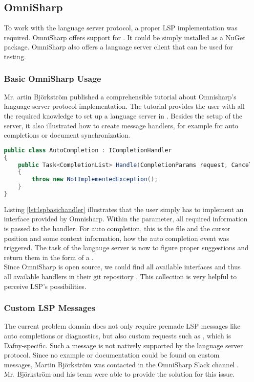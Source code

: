 \subsection{OmniSharp}
\label{section:analysis:omnisharp}
To work with the language server protocol, a proper LSP implementation was required.
OmniSharp offers support for \Csharp \cite{langserverdotorg}.
It could be simply installed as a NuGet package.
OmniSharp also offers a language server client that can be used for testing.

\subsubsection{Basic OmniSharp Usage}
Mr. artin Bj\"orkstr\"om published a comprehensible tutorial about Omnisharp's language server protocol implementation.
The tutorial provides the user with all the required knowledge to set up a language server in \Csharp.
Besides the setup of the server, it also illustrated how to create message handlers, for example for auto completions or document synchronization.

\begin{lstlisting}[language=csharp, caption={LSP Handler Implementation}, captionpos=b, label={lst:lspbasichandler}]
public class AutoCompletion : ICompletionHandler
{
    public Task<CompletionList> Handle(CompletionParams request, CancellationToken cancellationToken)
    {
        throw new NotImplementedException();
    }
}
\end{lstlisting}

Listing \ref{lst:lspbasichandler} illustrates that the user simply has to implement an interface provided by Omnisharp.
Within the  parameter, all required information is passed to the handler.
For auto completion, this is the file and the cursor position and some context information, how the auto completion event was triggered.
The task of the langauge server is now to figure proper suggestions and return them in the form of a .\\

Since OmniSharp is open source, we could find all available interfaces and thus all available handlers in their git repository \cite{omnisharpgit}.
This collection is very helpful to perceive LSP's possibilities.

\subsubsection{Custom LSP Messages}
\label{chapter:customlspmsg}
The current problem domain does not only require premade LSP messages like auto completions or diagnostics, but also custom requests such as , which is Dafny-specific.
Such a message is not natively supported by the language server protocol.
Since no example or documentation could be found on custom messages, Martin Bj\"orkstr\"om was contacted in the OmniSharp Slack channel \cite{omnisharpslack}.
Mr. Bj\"orkstr\"om and his team were able to provide the solution for this issue.\\

